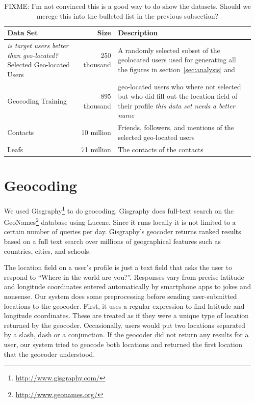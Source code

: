 \begin{table}[tbh]
\centering
\begin{tabular}{l r l}
    Data Set & Size & Description \\
    \hline
    \emph{is target users better than geo-located?}
    Selected Geo-located Users & 250 thousand & A randomly selected subset of
    the geolocated users used for generating all the figures in
    section~\ref{sec:analysis} and   \\
    Geocoding Training & 895 thousand & geo-located users who where not
    selected but who did fill out the location field of their profile 
    \emph{this data set needs a better name}\\
    Contacts & 10 million & Friends, followers, and mentions of the selected
    geo-located users \\
    Leafs & 71 million & The contacts of the contacts \\
\end{tabular}
\label{tab:DataTypes}
\caption{FIXME: I'm not convinced this is a good way to do show the datasets. Should we merege this into the bulleted list in the previous subsection?}
\end{table}

\section{Geocoding}
We used Gisgraphy\footnote{\url{http://www.gisgraphy.com/}} to do geocoding.
%
Gisgraphy does full-text search on the
GeoNames\footnote{\url{http://www.geonames.org/}} database using Lucene.
%
Since it runs locally it is not limited to a certain number of queries per day.
%
Gisgraphy's geocoder returns ranked results based on a full text search
over millions of geographical features such as countries, cities, and schools.

The location field on a user's profile is just a text field that asks the user
to respond to ``Where in the world are you?''.
%
Responses vary from precise latitude and longitude coordinates entered
automatically by smartphone apps to jokes and nonsense.
Our system does some preprocessing before sending user-submitted locations to
the geocoder.
First, it uses a regular expression to find latitude and longitude coordinates.
These are treated as if they were a unique type of location returned by the
geocoder.
Occasionally, users would put two locations separated by a slash, dash or a
conjunction.
If the geocoder did not return any results for a user, our system tried to
geocode both locations and returned the first location that the geocoder
understood.

